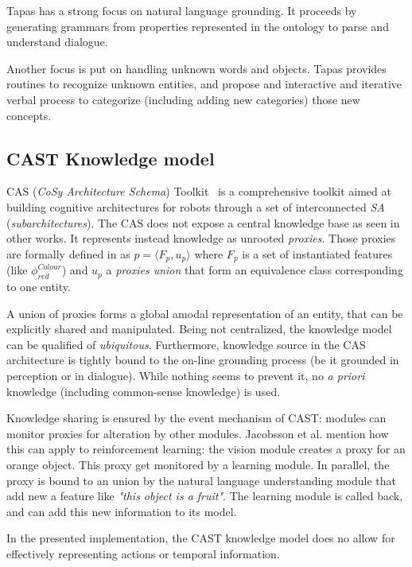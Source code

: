{\sc Tapas} has a strong focus on natural language grounding. It proceeds by
generating grammars from properties represented in the ontology to parse and
understand dialogue.

Another focus is put on handling unknown words and objects. {\sc Tapas}
provides routines to recognize unknown entities, and propose and interactive
and iterative verbal process to categorize (including adding new categories)
those new concepts.


\subsection{CAST Knowledge model}
\label{sect|cast}

CAS (\emph{CoSy Architecture Schema}) Toolkit~\cite{Hawes2007} is a
comprehensive toolkit aimed at building cognitive architectures for robots
through a set of interconnected \emph{SA} (\emph{subarchitectures}). The CAS does not
expose a central knowledge base as seen in other works. It represents instead knowledge as unrooted \emph{proxies}. Those proxies are formally
defined in \cite{Jacobsson2008} as $p= \langle F_p, u_p \rangle$ where $F_p$ is
a set of instantiated features (like $\phi^{Colour}_{red}$) and $u_p$ a
\emph{proxies union} that form an equivalence class corresponding to one
entity.

A union of proxies forms a global amodal representation of an entity, that can
be explicitly shared and manipulated. Being not centralized, the knowledge
model can be qualified of \emph{ubiquitous}. Furthermore, knowledge source in
the CAS architecture is tightly bound to the on-line grounding process (be it
grounded in perception or in dialogue). While nothing seems to prevent it, no
{\it a priori} knowledge (including common-sense knowledge) is used.

Knowledge sharing is ensured by the event mechanism of CAST: modules can
monitor proxies for alteration by other modules. Jacobsson et al. mention how
this can apply to reinforcement learning: the vision module creates a proxy for
an orange object. This proxy get monitored by a learning module. In parallel,
the proxy is bound to an union by the natural language understanding module
that add new a feature like \emph{"this object is a fruit"}. The learning
module is called back, and can add this new information to its model.

In the presented implementation, the CAST knowledge model does no allow for
effectively representing actions or temporal information.

